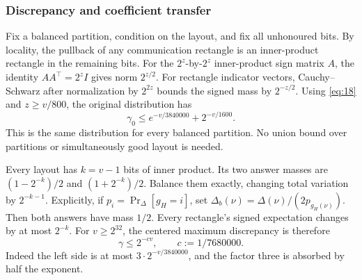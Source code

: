 \documentclass[11pt]{article}
\theoremstyle{definition}
\theoremstyle{remark}
\numberwithin{equation}{section}
\begin{document}
\subsubsection*{Discrepancy and coefficient transfer}

Fix a balanced partition, condition on the layout, and fix all
unhonoured bits. By locality, the pullback of any communication
rectangle is an inner-product rectangle in the remaining bits.
For the \(2^z\)-by-\(2^z\) inner-product sign matrix \(A\),
the identity \(AA^\top=2^z I\) gives norm \(2^{z/2}\).
For rectangle indicator vectors, Cauchy--Schwarz after normalization
by \(2^{2z}\) bounds the signed mass by \(2^{-z/2}\).
Using \eqref{eq:18} and \(z\ge v/800\), the original distribution has
\begin{equation}\label{eq:19}
\gamma_0\le e^{-v/3840000}+2^{-v/1600}.
\end{equation}
This is the same distribution for every balanced partition.
No union bound over partitions or simultaneously good layout
is needed.

Every layout has \(k=v-1\) bits of inner product. Its two answer
masses are \((1-2^{-k})/2\) and \((1+2^{-k})/2\).
Balance them exactly, changing total variation by \(2^{-k-1}\).
Explicitly, if \(p_i=\Pr_\Delta[g_H=i]\), set
\(\Delta_b(\nu)=\Delta(\nu)/(2p_{g_H(\nu)})\).
Then both answers have mass \(1/2\).
Every rectangle's signed expectation changes by at most \(2^{-k}\).
For \(v\ge2^{32}\), the centered maximum discrepancy is therefore
\begin{equation}\label{eq:20}
\gamma\le 2^{-cv},\qquad
                         c:=1/7680000.
\end{equation}
Indeed the left side is at most \(3\cdot2^{-v/3840000}\),
and the factor three is absorbed by half the exponent.
\end{document}
